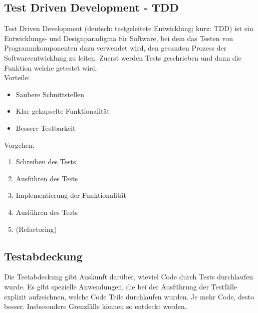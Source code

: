 \documentclass[12pt,a4paper]{article}
\begin{document}
\subsection{Test Driven Development - TDD}
Test Driven Development (deutsch: testgeleitete Entwicklung; kurz: TDD) ist ein Entwicklungs- und Designparadigma für Software, bei dem das Testen von Programmkomponenten dazu verwendet wird, den gesamten Prozess der Softwareentwicklung zu leiten. Zuerst werden Tests geschrieben und dann die Funktion welche getestet wird.\\
Vorteile:
\begin{itemize}
	\item Saubere Schnittstellen
	\item Klar gekapselte Funktionalität
	\item Bessere Testbarkeit
\end{itemize}
Vorgehen:
\begin{enumerate}
	\item Schreiben des Tests
	\item Ausführen des Tests
	\item Implementierung der Funktionalität
	\item Ausführen des Tests
	\item (Refactoring)
\end{enumerate}

\subsection{Testabdeckung}
Die Testabdeckung gibt Auskunft darüber, wieviel Code durch Tests durchlaufen wurde. Es gibt spezielle Anwendungen, die bei der Ausführung der Testfälle explizit aufzeichnen, welche Code Teile durchlaufen wurden. Je mehr Code, desto besser. Insbesondere Grenzfälle können so entdeckt werden.
\end{document}
